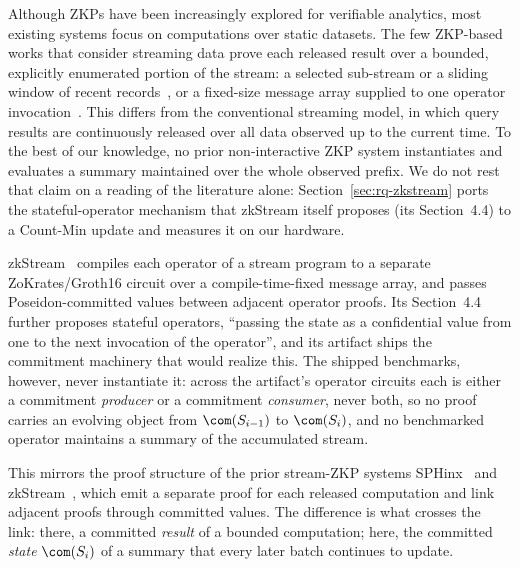 
Although ZKPs have been increasingly explored for verifiable analytics, most
existing systems focus on computations over static datasets. The few ZKP-based
works that consider streaming data prove each released result over a bounded,
explicitly enumerated portion of the stream: a selected sub-stream or a sliding
window of recent records~\cite{FioreTuckerSignedStreams2022}, or a fixed-size
message array supplied to one operator invocation~\cite{zkStreamMiddleware2024}.
This differs from the conventional streaming model, in which query results are
continuously released over all data observed up to the current time.
To the best of our knowledge, no prior non-interactive ZKP system instantiates
and evaluates a summary maintained over the whole observed prefix.  We do not
rest that claim on a reading of the literature alone: Section~\ref{sec:rq-zkstream}
ports the stateful-operator mechanism that zkStream itself
proposes (its Section~4.4) to a Count-Min update and measures it on our hardware.

zkStream~\cite{zkStreamMiddleware2024} compiles each operator of a stream program
to a separate ZoKrates/Groth16 circuit over a compile-time-fixed message array,
and passes Poseidon-committed values between adjacent operator proofs.  Its
Section~4.4 further proposes stateful operators, ``passing the state as a
confidential value from one to the next invocation of the operator'', and its
artifact ships the commitment machinery that would realize this.  The shipped
benchmarks, however, never instantiate it: across the artifact's operator
circuits each is either a commitment \emph{producer} or a commitment
\emph{consumer}, never both, so no proof carries an evolving object from
$\com(S_{i-1})$ to $\com(S_i)$, and no benchmarked operator maintains a summary of
the accumulated stream.

This mirrors the proof structure of the prior stream-ZKP
systems SPHinx~\cite{FioreTuckerSignedStreams2022} and
zkStream~\cite{zkStreamMiddleware2024}, which emit a separate proof for each
released computation and link adjacent proofs through committed values.  The
difference is what crosses the link: there, a committed \emph{result} of a
bounded computation; here, the committed \emph{state} $\com(S_i)$ of a summary
that every later batch continues to update.

